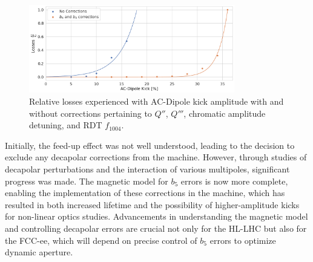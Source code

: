 \begin{figure}[!htb]
    \centering
    \includegraphics[width=0.8\textwidth]{./images/losses_with_without_b4b5corr.pdf}
    \caption{Relative losses experienced with AC-Dipole kick amplitude with and without corrections
    pertaining to $Q''$, $Q'''$, chromatic amplitude detuning, and RDT $f_{1004}$.}
    \label{fig:decapoles:losses_b4b5_corrs}
\end{figure}

Initially, the feed-up effect was not well understood, leading to the decision to exclude any
decapolar corrections from the machine. However, through studies of decapolar perturbations and the
interaction of various multipoles, significant progress was made. The magnetic model for $b_5$
errors is now more complete, enabling the implementation of these corrections in the machine, which
has resulted in both increased lifetime and the possibility of higher-amplitude kicks for non-linear
optics studies.
%
Advancements in understanding the magnetic model and controlling decapolar errors are crucial not
only for the HL-LHC but also for the FCC-ee, which will depend on precise control of $b_5$ errors to
optimize dynamic aperture.